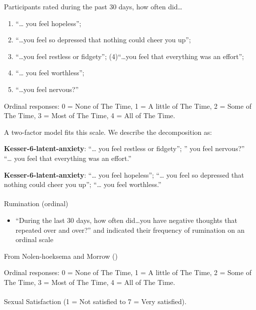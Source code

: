 \documentclass[
  single column]{article}
\makeatletter
\let\oldparagraph\paragraph
\renewcommand{\paragraph}{
    \@ifstar
      \xxxParagraphStar
      \xxxParagraphNoStar
  }
\newcommand{\xxxParagraphStar}[1]{\oldparagraph*{#1}\mbox{}}
\newcommand{\xxxParagraphNoStar}[1]{\oldparagraph{#1}\mbox{}}
\providecommand{\tightlist}{%
  \setlength{\itemsep}{0pt}\setlength{\parskip}{0pt}}\usepackage{longtable,booktabs,array}
\makeatother
\begin{document}
Participants rated during the past 30 days, how often did\ldots{}

\begin{enumerate}
\def\labelenumi{(\arabic{enumi})}
\tightlist
\item
  ``\ldots{} you feel hopeless'';
\item
  ``\ldots you feel so depressed that nothing could cheer you up'';
\item
  ``\ldots you feel restless or fidgety''; (4)``\ldots you feel that
  everything was an effort'';
\item
  ``\ldots{} you feel worthless'';
\item
  ``\ldots you feel nervous?''
\end{enumerate}

Ordinal responses: 0 = None of The Time, 1 = A little of The Time, 2 =
Some of The Time, 3 = Most of The Time, 4 = All of The Time.

A two-factor model fits this scale. We describe the decomposition as:

\textbf{Kesser-6-latent-anxiety}: ``\ldots{} you feel restless or
fidgety''; '' you feel nervous?'' ``\ldots{} you feel that everything
was an effort.''

\textbf{Kesser-6-latent-anxiety}: ``\ldots{} you feel hopeless'';
``\ldots{} you feel so depressed that nothing could cheer you up'';
``\ldots{} you feel worthless.''

\paragraph{Rumination (ordinal)}\label{rumination-ordinal}

\begin{itemize}
\tightlist
\item
  ``During the last 30 days, how often did\ldots you have negative
  thoughts that repeated over and over?'' and indicated their frequency
  of rumination on an ordinal scale
\end{itemize}

From Nolen-hoeksema and Morrow
()

Ordinal responses: 0 = None of The Time, 1 = A little of The Time, 2 =
Some of The Time, 3 = Most of The Time, 4 = All of The Time.

\paragraph{Sexual Satisfaction (1 = Not satisfied to 7 = Very
satisfied).}\label{sexual-satisfaction-1-not-satisfied-to-7-very-satisfied.}
\end{document}
